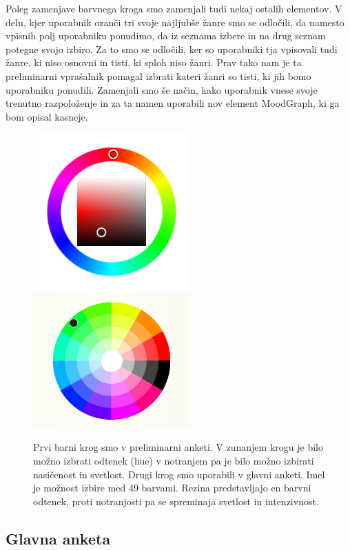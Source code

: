 \documentclass[a4paper, 12pt]{book}
\begin{document}
{Poleg zamenjave barvnega kroga smo zamenjali tudi nekaj ostalih elementov. V delu, kjer uporabnik ozanči tri svoje najljubše žanre smo se odločili, da namesto vpisnih polj uporabniku ponudimo, da iz seznama izbere in na drug seznam potegne svojo izbiro. Za to smo se odločili, ker so uporabniki tja vpisovali tudi žanre, ki niso osnovni in tisti, ki sploh niso žanri. Prav tako nam je ta preliminarni vprašalnik pomagal izbrati kateri žanri so tisti, ki jih bomo uporabniku ponudili. Zamenjali smo še način, kako uporabnik vnese svoje trenutno razpoloženje in za ta namen uporabili nov element MoodGraph, ki ga bom opisal kasneje. 

\begin{figure}[ht]
\centering
\includegraphics[width=60mm]{colorwheelold.png}
\includegraphics[width=60mm]{colorwheel.png}

\caption{Prvi barni krog smo v preliminarni anketi. V zunanjem krogu je bilo možno izbrati odtenek (hue) v notranjem pa je bilo možno izbirati nasičenost in svetlost. Drugi krog smo uporabili v glavni anketi. Imel je možnost izbire med 49 barvami. Rezina predstavljajo en barvni odtenek, proti notranjosti pa se spreminaja svetlost in intenzivnost. }
\label{colorwheels}
\end{figure}

\subsection{Glavna anketa}

}
\end{document}
